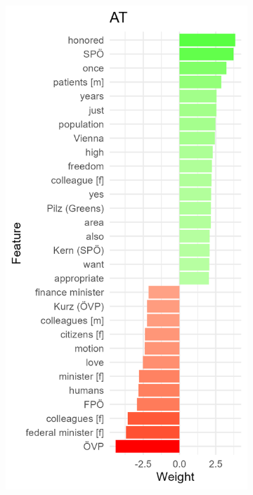 \documentclass{article}
\begin{document}
\begin{figure}
\begin{subfigure}[b]{0.3\textwidth}
         \label{fig:y equals x}
     \end{subfigure}
     \hfill
     \begin{subfigure}[b]{0.3\textwidth}
         \centering
         \includegraphics[width=\textwidth]{AT/vis/AT_weights.png}

\end{subfigure}
\end{figure}
\end{document}
